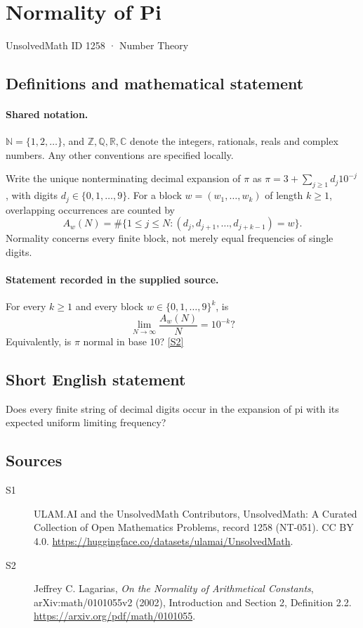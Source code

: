 \documentclass[11pt]{article}
\newcommand{\sref}[2]{\hyperlink{source:#1:#2}{[S#2]}}
\begin{document}
\setcounter{section}{1257}
\section{Normality of Pi}\label{1258}
{\small\sffamily UnsolvedMath ID 1258 · Number Theory}
\subsection{Definitions and mathematical statement}

\paragraph{Shared notation.}$\mathbb N=\{1,2,\ldots\}$, and $\mathbb Z,\mathbb Q,\mathbb R,\mathbb C$ denote the integers, rationals, reals and complex numbers. Any other conventions are specified locally.


Write the unique nonterminating decimal expansion of $\pi$ as $\pi=3+\sum_{j\geq1}d_j10^{-j}$, with digits $d_j\in\{0,1,\ldots,9\}$. For a block $w=(w_1,\ldots,w_k)$ of length $k\geq1$, overlapping occurrences are counted by
\[
A_w(N)=\#\{1\leq j\leq N:(d_j,d_{j+1},\ldots,d_{j+k-1})=w\}.
\]
Normality concerns every finite block, not merely equal frequencies of single digits.
\paragraph{Statement recorded in the supplied source.}
For every $k\geq1$ and every block $w\in\{0,1,\ldots,9\}^k$, is
\[
\lim_{N\to\infty}\frac{A_w(N)}N=10^{-k}?
\]
Equivalently, is $\pi$ normal in base $10$? \sref{1258}{2}

\subsection{Short English statement}
Does every finite string of decimal digits occur in the expansion of pi with its expected uniform limiting frequency?
\subsection{Sources}
\begin{description}
\item[\hypertarget{source:1258:1}{S1}] ULAM.AI and the UnsolvedMath Contributors, UnsolvedMath: A Curated Collection of Open Mathematics Problems, record 1258 (NT-051). CC BY 4.0. \url{https://huggingface.co/datasets/ulamai/UnsolvedMath}.
\item[\hypertarget{source:1258:2}{S2}] Jeffrey C. Lagarias, \emph{On the Normality of Arithmetical Constants}, arXiv:math/0101055v2 (2002), Introduction and Section 2, Definition 2.2. \url{https://arxiv.org/pdf/math/0101055}.
\end{description}
\label{end:1258}
\end{document}
